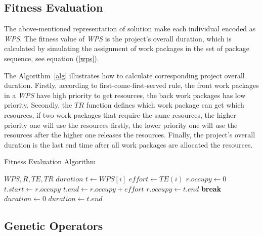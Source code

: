   \vspace{-2mm}
\subsection{Fitness Evaluation}
 \vspace{-2mm}
The above-mentioned representation of solution make each individual encoded as
\emph{WPS}. The fitness value of \emph{WPS} is the project's overall duration,
which is calculated by simulating the assignment of work packages in the set of
package sequence, see equation (\ref{wps}).

The Algorithm~\ref{alg} illustrates  how to calculate corresponding project overall
duration. Firstly, according to first-come-first-served
rule, the front work packages in a \emph{WPS} have high priority to get
resources, the back work packages has low priority. Secondly, the $TR$ function
defines which work package can get which resources, if two work packages that
require the same resources, the higher priority one will use the resources
firstly, the lower priority one will use the resources after the higher one
releases the resources. Finally, the project's overall duration is the last end
time after all work packages are allocated the resources.

\begin{algorithm}[!h]
  \caption{Fitness Evaluation Algorithm}
  \label{alg}
  \begin{algorithmic}
    \REQUIRE $WPS, R, TE, TR$
    \ENSURE $duration$
      \STATE $t \gets WPS[i]$
      \STATE $ effort \gets TE(i)$
        \STATE $r.occupy \gets 0$
      \ENDFOR 
          \STATE $t.start \gets r.occupy$
          \STATE $t.end \gets r.occupy + effort$
          \STATE $r.occupy \gets t.end$
          \STATE \textbf{break}
        \ENDIF
      \ENDFOR
    \ENDFOR
    \STATE $duration \gets 0$  
        \STATE $duration \gets t.end$
      \ENDIF
    \ENDFOR
  \end{algorithmic}
\end{algorithm}
  \vspace{-2mm}
\subsection{Genetic Operators}
%

